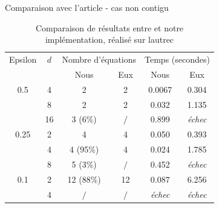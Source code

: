 \documentclass{backend/backend}
\begin{document}
\begin{frame}{Comparaison avec l'article - cas non contigu}

\begin{center}
    \begin{table}[H]
        \centering
        \caption{Comparaison de résultats entre \cite{latAtk} et notre implémentation, réalisé sur lautrec}
        \label{tab:comparaison_signatures_non_contigu}
        
        \begin{tabular}{|c|c|cc|cc|}
            \toprule
            Epsilon & $d$  & \multicolumn{2}{|c|}{Nombre d'équations} & \multicolumn{2}{|c|}{Temps (secondes)} \\
            \cmidrule{3-6}
            && Nous & Eux & Nous & Eux \\
            \midrule
                0.5 & 4  & 2 & 2 & 0.0067 & 0.304  \\
                    & 8  & 2 & 2 & 0.032 & 1.135 \\
                    & 16 & 3 {\footnotesize (6\%)} & $/$ & 0.899 & \textit{échec} \\
                \hline
                0.25 & 2 & 4 & 4 & 0.050 & 0.393 \\
                     & 4 & 4 {\footnotesize (95\%)} & 4 & 0.024 & 1.785 \\
                     & 8 & 5 {\footnotesize (3\%)} & $/$ & 0.452 & \textit{échec} \\
                \hline
                 0.1 & 2 & 12 {\footnotesize (88\%)} & 12 & 0.087 & 6.256 \\
                     & 4 & $/$ & $/$ & \textit{échec} & \textit{échec} \\
    
            \bottomrule
        \end{tabular}
    \end{table}
\end{center}

\end{frame}
\end{document}
